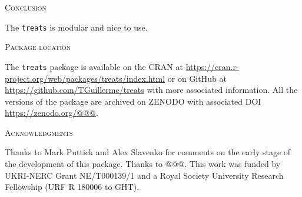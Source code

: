 \documentclass[12pt,letterpaper]{article}
\renewcommand{\section}[1]{%
\bigskip
\begin{center}
\begin{Large}
\normalfont\scshape #1
\medskip
\end{Large}
\end{center}}
\newcommand{\treats}{\texttt{treats} }
\begin{document}
\section{Conclusion}
The \treats is modular and nice to use.

\section{Package location}
The \treats package is available on the CRAN at \url{https://cran.r-project.org/web/packages/treats/index.html} or on GitHub at \url{https://github.com/TGuillerme/treats} with more associated information.
All the versions of the package are archived on ZENODO with associated DOI \url{https://zenodo.org/@@@}.

\section{Acknowledgments}
Thanks to Mark Puttick and Alex Slavenko for comments on the early stage of the development of this package. Thanks to @@@. This work was funded by UKRI-NERC Grant NE/T000139/1 and a Royal Society University Research Fellowship (URF R 180006 to GHT).



\end{document}
